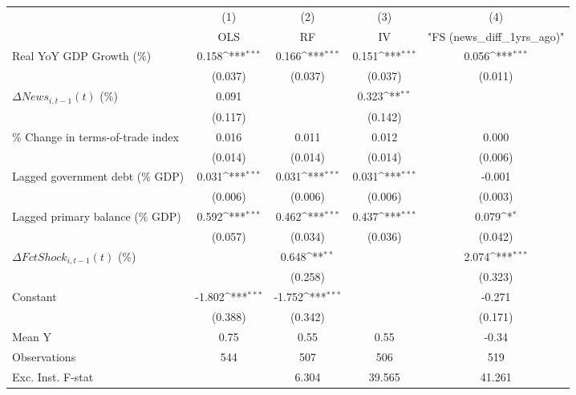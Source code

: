 {
\def\sym#1{\ifmmode^{#1}\else\(^{#1}\)\fi}
\begin{tabular}{l*{4}{c}}
\toprule
                    &\multicolumn{1}{c}{(1)}&\multicolumn{1}{c}{(2)}&\multicolumn{1}{c}{(3)}&\multicolumn{1}{c}{(4)}\\
                    &\multicolumn{1}{c}{OLS}&\multicolumn{1}{c}{RF}&\multicolumn{1}{c}{IV}&\multicolumn{1}{c}{ "FS (news_diff_1yrs_ago)" }\\
\midrule
Real YoY GDP Growth (\%)&       0.158\sym{***}&       0.166\sym{***}&       0.151\sym{***}&       0.056\sym{***}\\
                    &     (0.037)         &     (0.037)         &     (0.037)         &     (0.011)         \\
\addlinespace
$ \Delta News_{i,t-1}(t)$ (\%)&       0.091         &                     &       0.323\sym{**} &                     \\
                    &     (0.117)         &                     &     (0.142)         &                     \\
\addlinespace
\% Change in terms-of-trade index&       0.016         &       0.011         &       0.012         &       0.000         \\
                    &     (0.014)         &     (0.014)         &     (0.014)         &     (0.006)         \\
\addlinespace
Lagged government debt (\% GDP)&       0.031\sym{***}&       0.031\sym{***}&       0.031\sym{***}&      -0.001         \\
                    &     (0.006)         &     (0.006)         &     (0.006)         &     (0.003)         \\
\addlinespace
Lagged primary balance (\% GDP)&       0.592\sym{***}&       0.462\sym{***}&       0.437\sym{***}&       0.079\sym{*}  \\
                    &     (0.057)         &     (0.034)         &     (0.036)         &     (0.042)         \\
\addlinespace
$ \Delta FctShock_{i,t-1}(t)$ (\%)&                     &       0.648\sym{**} &                     &       2.074\sym{***}\\
                    &                     &     (0.258)         &                     &     (0.323)         \\
\addlinespace
Constant            &      -1.802\sym{***}&      -1.752\sym{***}&                     &      -0.271         \\
                    &     (0.388)         &     (0.342)         &                     &     (0.171)         \\
\midrule
Mean Y              &        0.75         &        0.55         &        0.55         &       -0.34         \\
Observations        &         544         &         507         &         506         &         519         \\
Exc. Inst. F-stat   &                     &       6.304         &      39.565         &      41.261         \\
\bottomrule
\end{tabular}
}
